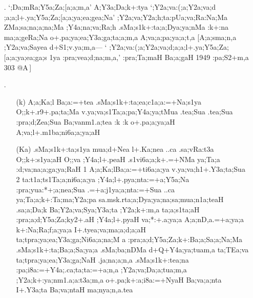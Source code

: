 \begin{spacing}{1.15}
\begin{itemize}
 \item[{\sktf 6}.]  `{\sktf ;Da;mRa;Y5a;Za;[a;a;m,a}' {\sktf
A;Y3a;Da;k+:tya} `{\sktf ;Y2a;va:(;a;Y2a;va;d%
;a;a;l+.ya\ZF{-};Y5a;Za;[a;a;ya;ea;gea;Na}' {\sktf
;Y2a;va;Y2a;h;ta\ZF{-}:pUa{;va;Ra}{:Na;Ma}} {\sktf ZMa;sa;na;a;na;Ma ;Y4a;na;va;Ra;h\ZF{,}} {\sktf
.sMa;s1k+:ta;a;Dya;ya;nMa :k+:na ma;a;geRa;Na
o+.pa;ya;ea;Y3a;ga;ta;a;m,a A;va;a;pa;ya;a;t,a%
} [{\sktf A;a;sma;n,a ;Y2a;va;Sa{yea} d+S1;v.ya;m,a}{\rm ---} `{\sktf
;Y2a;va:(;a;Y2a;va;d;a;a;l+.ya\ZF{-};Y5a;Za;[a;a;ya;ea;ga;s%
1ya :pra;vea;d;na;m,a},' {\sktf :pra;Ta;maH Ba;a;gaH 1949\ZF{,}
:pa;S2+m,a 303 @A}\,]   
 
 \item[{\sktf 7}.] \begin{itemize}
  \item[({\sktf k})]  {\sktf A;a;Ka;l Ba;a:=+tea
.sMa;s1k+:ta;ea;c1a;a:=+Na;s1ya O;;k+.r9+.pa;ta;Ma
v.ya;va;s1Ta;a;pa;Y4a;ya;tMua .tea;Sua .tea;Sua :pra;d;Zea;Sua Ba{;va}nm1.a;tea :k :k o+.pa;a;ya;aH
A;va;l+.m1ba;ni6a;a;ya;aH} 
            
  \item[({\sktf Ka})] {\sktf .sMa;s1k+:ta;s1ya
mua;d+Nea l+.Ka;nea ..ca .sa;vRa:t3a
O;;k+:s1ya;aH O;;va ;Y4a;l+.peaH .s1vi6a;a;k+.=+NMa
\ZF{(}ya;Ta;a\ZF{,} :d;va;na;a;ga;ya;RaH\ZF{)} \ZF{(}1\ZF{)} A;a;Ka;l\ZF{-}Ba;a:=+ti6a;a;ya%
\ZF{-}v.ya;va;h1+.Y3a;ta;Sua\ZF{,} \ZF{(}2\ZF{)} ta:t1a;ts1Ta;a;ni6a;a;ya%
\ZF{-};Y4a;l+.pya;nta:=+a;Y5a;Na :pra;yua:*+;a;nea;Sua
.=+a:j1ya;a;nta:=+Sua ..ca ya;Ta;a;k{+:Ta};ma;Y2a;pa} {\sktf sa.msk.r}{\sktf ta;a;Dya;ya;na;sa;mua;n1a;teaH} {\sktf
.sa;a;Da;k Ba;Y2a;va;Sya;Y3a;ta ;Y2a;k+:m,a
ta;a;s1ta;aH :pra;a;d;Y5a;Za;ky2+.aH ;Y4a;l+.pyaH
\ZF{(}va;*:+.a;ya;a\ZF{,} A;a;nD,a.=+a;ya;a\ZF{,} k+:Na;Ra;f;a;ya;a\ZF{,}
I+.tyea;va;ma;a;d;a;aH\ZF{)} ta;tpra;ya;ea;Y3a;ga;Ni6a;a;na;M%
a :pra;a;d;Y5a;Za;k+:Ba;a;Sa;a;Na;Ma .sMa;s1k+:ta;Ba;a;Sa;ya;a .sMa;ba;nDMa d+Q+Y4a;ya;tuam,a\ZF{,} ta;TEa;va ta;tpra;ya;ea;Y3a;ga;NaH .ja;na;a;n,a
.sMa;s1k+:tea;na :pa;i8a:=+Y4a;.ca;ta;ta:=+a;n,a
;Y2a;va;Da;a;tua;m,a\ZF{,} ;Y2a;k+:ya;nm1.a;a:t3a;m,a
o+.pa;k+:a;i8a:=+NyaH Ba;va;a;nta I+.Y3a;ta
Ba;va;ntaH ma;nya;n,a.tea}
	
 \end{itemize}
\end{itemize}
\end{spacing}

